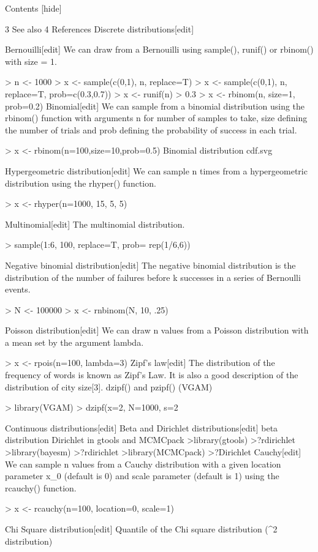 \documentclass[12pt, a4paper]{article}
\theoremstyle{plain}
\theoremstyle{definition}
\theoremstyle{remark}
\begin{document}
Contents  [hide] 

3 See also
4 References
Discrete distributions[edit]


Bernouilli[edit]
We can draw from a Bernouilli using sample(), runif() or rbinom() with size = 1.

> n <- 1000
> x <- sample(c(0,1), n, replace=T)
> x <- sample(c(0,1), n, replace=T, prob=c(0.3,0.7))
> x <- runif(n) > 0.3
> x <- rbinom(n, size=1, prob=0.2)
Binomial[edit]
We can sample from a binomial distribution using the rbinom() function with arguments n for number of samples to take, size defining the number of trials and prob defining the probability of success in each trial.

> x <- rbinom(n=100,size=10,prob=0.5)
Binomial distribution cdf.svg


Hypergeometric distribution[edit]
We can sample n times from a hypergeometric distribution using the rhyper() function.

> x <- rhyper(n=1000, 15, 5, 5)




Multinomial[edit]
The multinomial distribution.

> sample(1:6, 100, replace=T, prob= rep(1/6,6))


Negative binomial distribution[edit]
The negative binomial distribution is the distribution of the number of failures before k successes in a series of Bernoulli events.

> N <- 100000
> x <- rnbinom(N, 10, .25)


Poisson distribution[edit]
We can draw n values from a Poisson distribution with a mean set by the argument lambda.

> x <- rpois(n=100, lambda=3)
Zipf's law[edit]
The distribution of the frequency of words is known as Zipf's Law. It is also a good description of the distribution of city size[3]. dzipf() and pzipf() (VGAM)

> library(VGAM)
> dzipf(x=2, N=1000, s=2


Continuous distributions[edit]
Beta and Dirichlet distributions[edit]
beta distribution
Dirichlet in gtools and MCMCpack
>library(gtools)
>?rdirichlet
>library(bayesm)
>?rdirichlet
>library(MCMCpack)
>?Dirichlet
Cauchy[edit]
We can sample n values from a Cauchy distribution with a given location parameter x_0 (default is 0) and scale parameter \gamma (default is 1) using the rcauchy() function.

> x <- rcauchy(n=100, location=0, scale=1)


Chi Square distribution[edit]
Quantile of the Chi square distribution (\chi^2 distribution)
\end{document}
